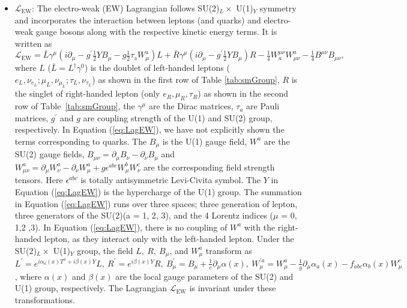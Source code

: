 \begin{itemize} [leftmargin=*]
\item \textbf{$\mathcal{L}_\text{EW}$}: The electro-weak (EW) Lagrangian
				follows SU(2)$_L\times$ U(1)$_Y$ symmetry and incorporates the interaction 
				between leptons (and quarks) and electro-weak gauge bosons along with the respective kinetic 
				energy terms. It is written as
				\begin{equation}
								\mathcal{L}_\text{EW} = \bar L \gamma^\mu \left(i\partial_\mu 
								- g^\prime \tfrac12 Y B_\mu - g \tfrac12 \tau_\text{a} 
								W_\mu^{\text{a}}\right)L + \bar R \gamma^\mu \left(i\partial_\mu 
								- g^\prime \tfrac12 Y B_\mu \right)R - \tfrac{1}{4} W_a^{\mu\nu} 
								W_{\mu\nu}^a - \tfrac{1}{4} B^{\mu\nu} B_{\mu\nu},
				\label{eq:LagEW}
				\end{equation}
				where $L$ ($\bar{L} = L^\dagger 
				\gamma^0$) is the doublet of left-handed leptons ($e_L, \nu_{e_L}; \mu_L, 
				\nu_{\mu_L}; \tau_L, \nu_{\tau_L}$) as shown in the first row of Table 
				\ref{tab:smGroup}, $R$ is the singlet of 
				right-handed lepton (only $e_R, \mu_R, \tau_R$) as shown in the second 
				row of Table~\ref{tab:smGroup}, the $\gamma^\mu$ are the Dirac matrices, $\tau_a$ are Pauli matrices, 
				$g^\prime$ and $g$ are coupling strength of the U(1) and SU(2) group, 
				respectively. In Equation (\ref{eq:LagEW}), we have not explicitly
shown the terms corresponding to quarks. The $B_\mu$ is the U(1) gauge field, 
				$W^a$ are the SU(2) gauge fields, $B_{\mu\nu} = 
				\partial_\mu 
				B_\nu - \partial_\nu B_\mu$ and $W_{\mu\nu}^a = \partial_\mu W_\nu^a - 
				\partial_\nu W_\mu^a + g \epsilon^{abc}W_\mu^bW_\nu^c$ are the 
				corresponding field strength tensors. Here $\epsilon^{abc}$ is totally 
antisymmetric Levi-Civita symbol. The $Y$ in Equation (\ref{eq:LagEW}) is the 
				hypercharge of the U(1) group. The summation in Equation (\ref{eq:LagEW}) 
				runs over three spaces; three generation of lepton, three generators of 
				the SU(2)(a = 1, 2, 3), and the 4 Lorentz indices ($\mu$ = 0, 1,2 ,3). 
				In Equation (\ref{eq:LagEW}), there is no coupling of $W^a$ with the 
				right-handed lepton, as they interact only with the left-handed 
				lepton. Under
				the SU(2)$_L\times$ U(1)$_Y$ group, the field $L, ~R, ~B_\mu$, and $W_\mu^a$ transform as $L^\prime = 
				e^{i\alpha_a(x)T^a + i\beta(x)Y}L, ~R^\prime = e^{i\beta(x)Y}R, 
				~B_\mu^\prime = B_\mu + \frac{1}{e}\partial_\mu\alpha(x), ~W_\mu^{\prime a}
				= W_\mu^a - \frac{1}{g}\partial_\mu\alpha_a(x) - f_{abc}\alpha_b(x) 
				W^c_\mu$, where $\alpha (x)$ and $\beta (x)$ are the local gauge parameters
				of the SU(2) and U(1) group, respectively. The Lagrangian $\mathcal{L}_\text{EW}$ is 
				invariant under these transformations.


\end{itemize}
